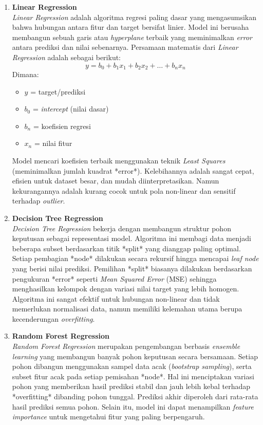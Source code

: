 \begin{enumerate}
    \item \textbf{Linear Regression}\\
    \textit{Linear Regression} adalah algoritma regresi paling dasar yang mengasumsikan bahwa hubungan antara fitur dan target bersifat linier. Model ini berusaha membangun sebuah garis atau \textit{hyperplane} terbaik yang meminimalkan \textit{error} antara prediksi dan nilai sebenarnya. Persamaan matematis dari \textit{Linear Regression} adalah sebagai berikut:
    \begin{equation}
        y = b_0 + b_1x_1 + b_2x_2 + \dots + b_nx_n
    \end{equation}
    Dimana:
    \begin{itemize}
        \item $y$ = target/prediksi
        \item $b_0$ = \textit{intercept} (nilai dasar)
        \item $b_n$ = koefisien regresi
        \item $x_n$ = nilai fitur
    \end{itemize}
    Model mencari koefisien terbaik menggunakan teknik \textit{Least Squares} (meminimalkan jumlah kuadrat *error*). Kelebihannya adalah sangat cepat, efisien untuk dataset besar, dan mudah diinterpretasikan. Namun kekurangannya adalah kurang cocok untuk pola non-linear dan sensitif terhadap \textit{outlier}.

    \item \textbf{Decision Tree Regression}\\
    \textit{Decision Tree Regression} bekerja dengan membangun struktur pohon keputusan sebagai representasi model. Algoritma ini membagi data menjadi beberapa subset berdasarkan titik *split* yang dianggap paling optimal. Setiap pembagian *node* dilakukan secara rekursif hingga mencapai \textit{leaf node} yang berisi nilai prediksi. Pemilihan *split* biasanya dilakukan berdasarkan pengukuran *error* seperti \textit{Mean Squared Error} (MSE) sehingga menghasilkan kelompok dengan variasi nilai target yang lebih homogen. Algoritma ini sangat efektif untuk hubungan non-linear dan tidak memerlukan normalisasi data, namun memiliki kelemahan utama berupa kecenderungan \textit{overfitting}.

    \item \textbf{Random Forest Regression}\\
    \textit{Random Forest Regression} merupakan pengembangan berbasis \textit{ensemble learning} yang membangun banyak pohon keputusan secara bersamaan. Setiap pohon dibangun menggunakan sampel data acak (\textit{bootstrap sampling}), serta subset fitur acak pada setiap pemisahan *node*. Hal ini menciptakan variasi pohon yang memberikan hasil prediksi stabil dan jauh lebih kebal terhadap *overfitting* dibanding pohon tunggal. Prediksi akhir diperoleh dari rata-rata hasil prediksi semua pohon. Selain itu, model ini dapat menampilkan \textit{feature importance} untuk mengetahui fitur yang paling berpengaruh.
\end{enumerate}

